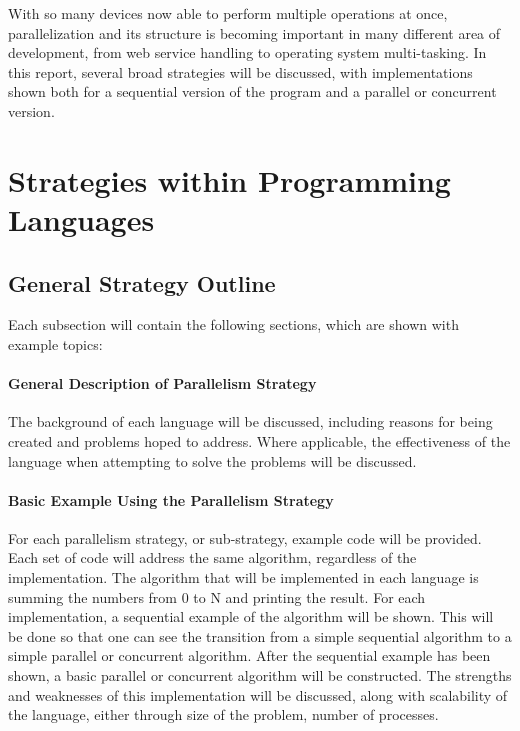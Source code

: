 \documentclass[12pt]{article}
\begin{document}
With so many devices now able to perform multiple operations at once, parallelization and its structure is becoming important in many different area of development, from web service handling to operating system multi-tasking. In this report, several broad strategies will be discussed, with implementations shown both for a sequential version of the program and a parallel or concurrent version.

\section{Strategies within Programming Languages}

\subsection{General Strategy Outline}

Each subsection will contain the following sections, which are shown with example topics:

\paragraph{General Description of Parallelism Strategy}

The background of each language will be discussed, including reasons  for being created and problems hoped to address. Where applicable, the effectiveness of the language when attempting to solve the problems will be discussed.

\paragraph{Basic Example Using the Parallelism Strategy}

For each parallelism strategy, or sub-strategy, example code will be provided. Each set of  code will address the same algorithm, regardless of the implementation. The algorithm that will be implemented in each language is summing the numbers from 0 to N and printing the result.
For each implementation, a sequential example of the algorithm will be shown. This will be done so that one can see the transition from a simple sequential algorithm to a simple parallel or concurrent algorithm.
After the sequential example has been shown, a basic parallel or concurrent algorithm will be constructed. The strengths and weaknesses of this implementation will be discussed, along with scalability of the language, either through size of the problem, number of processes.
\end{document}
